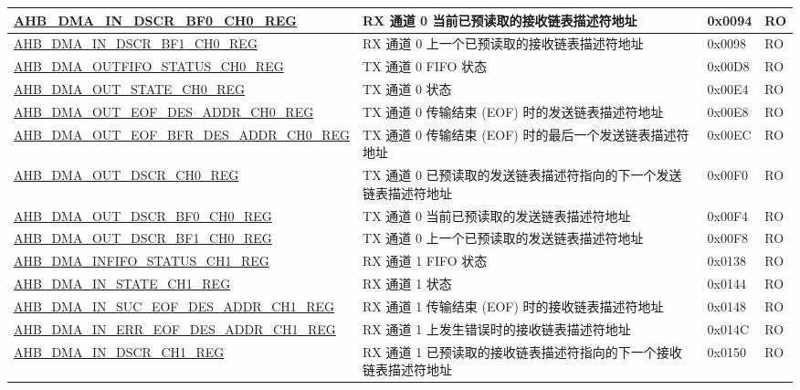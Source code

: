 \begin{longtable}{ | l | l | p{1.3cm} | l | }
\hyperref[regdesc:AHBDMAINDSCRBF0CHNREG]{AHB\_DMA\_IN\_DSCR\_BF0\_CH0\_REG} & RX 通道 0 当前已预读取的接收链表描述符地址 & 0x0094 & RO \\ \hline
\hyperref[regdesc:AHBDMAINDSCRBF1CHNREG]{AHB\_DMA\_IN\_DSCR\_BF1\_CH0\_REG} & RX 通道 0 上一个已预读取的接收链表描述符地址 & 0x0098 & RO \\ \hline
\hyperref[regdesc:AHBDMAOUTFIFOSTATUSCHNREG]{AHB\_DMA\_OUTFIFO\_STATUS\_CH0\_REG} & TX 通道 0 FIFO 状态 & 0x00D8 & RO \\ \hline
\hyperref[regdesc:AHBDMAOUTSTATECHNREG]{AHB\_DMA\_OUT\_STATE\_CH0\_REG} & TX 通道 0 状态 & 0x00E4 & RO \\ \hline
\hyperref[regdesc:AHBDMAOUTEOFDESADDRCHNREG]{AHB\_DMA\_OUT\_EOF\_DES\_ADDR\_CH0\_REG} & TX 通道 0 传输结束 (EOF) 时的发送链表描述符地址 & 0x00E8 & RO \\ \hline
\hyperref[regdesc:AHBDMAOUTEOFBFRDESADDRCHNREG]{AHB\_DMA\_OUT\_EOF\_BFR\_DES\_ADDR\_CH0\_REG} & TX 通道 0 传输结束 (EOF) 时的最后一个发送链表描述符地址 & 0x00EC & RO \\ \hline
\hyperref[regdesc:AHBDMAOUTDSCRCHNREG]{AHB\_DMA\_OUT\_DSCR\_CH0\_REG} & TX 通道 0 已预读取的发送链表描述符指向的下一个发送链表描述符地址 & 0x00F0 & RO \\ \hline
\hyperref[regdesc:AHBDMAOUTDSCRBF0CHNREG]{AHB\_DMA\_OUT\_DSCR\_BF0\_CH0\_REG} & TX 通道 0 当前已预读取的发送链表描述符地址 & 0x00F4 & RO \\ \hline
\hyperref[regdesc:AHBDMAOUTDSCRBF1CHNREG]{AHB\_DMA\_OUT\_DSCR\_BF1\_CH0\_REG} & TX 通道 0 上一个已预读取的发送链表描述符地址 & 0x00F8 & RO \\ \hline
\hyperref[regdesc:AHBDMAINFIFOSTATUSCHNREG]{AHB\_DMA\_INFIFO\_STATUS\_CH1\_REG} & RX 通道 1 FIFO 状态 & 0x0138 & RO \\ \hline
\hyperref[regdesc:AHBDMAINSTATECHNREG]{AHB\_DMA\_IN\_STATE\_CH1\_REG} & RX 通道 1 状态 & 0x0144 & RO \\ \hline
\hyperref[regdesc:AHBDMAINSUCEOFDESADDRCHNREG]{AHB\_DMA\_IN\_SUC\_EOF\_DES\_ADDR\_CH1\_REG} & RX 通道 1 传输结束 (EOF) 时的接收链表描述符地址 & 0x0148 & RO \\ \hline
\hyperref[regdesc:AHBDMAINERREOFDESADDRCHNREG]{AHB\_DMA\_IN\_ERR\_EOF\_DES\_ADDR\_CH1\_REG} & RX 通道 1 上发生错误时的接收链表描述符地址 & 0x014C & RO \\ \hline
\hyperref[regdesc:AHBDMAINDSCRCHNREG]{AHB\_DMA\_IN\_DSCR\_CH1\_REG} & RX 通道 1 已预读取的接收链表描述符指向的下一个接收链表描述符地址 & 0x0150 & RO \\ \hline

\end{longtable}
